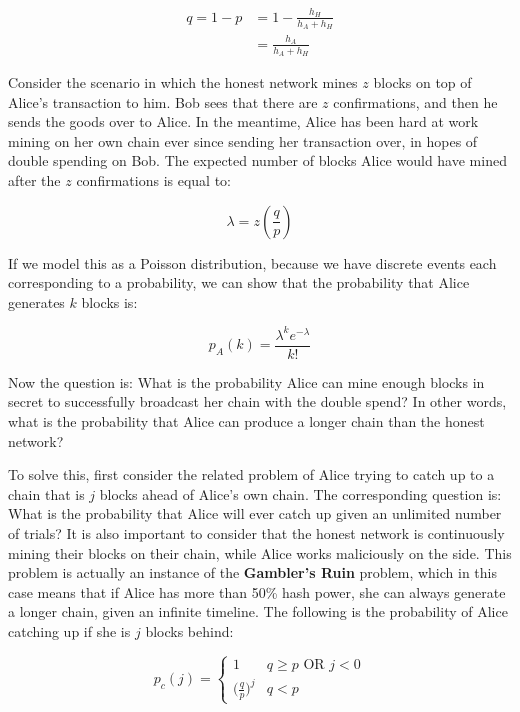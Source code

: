 \documentclass[full.tex]{subfiles}
\begin{document}
   \begin{equation*}
       \begin{split*}
           q = 1-p &= 1 - \frac{h_H}{h_A + h_H} \\
           &= \frac{h_A}{h_A + h_H}
       \end{split*}
   \end{equation*}
   
   Consider the scenario in which the honest network mines $z$ blocks on top of Alice's transaction to him. Bob sees that there are $z$ confirmations, and then he sends the goods over to Alice. In the meantime, Alice has been hard at work mining on her own chain ever since sending her transaction over, in hopes of double spending on Bob. The expected number of blocks Alice would have mined after the $z$ confirmations is equal to:
   
   $$\lambda = z(\frac{q}{p})$$
   
   If we model this as a Poisson distribution, because we have discrete events each corresponding to a probability, we can show that the probability that Alice generates $k$ blocks is:
   
   $$p_A(k) = \frac{\lambda^k e^{-\lambda}}{k!}$$
   
   Now the question is: What is the probability Alice can mine enough blocks in secret to successfully broadcast her chain with the double spend? In other words, what is the probability that Alice can produce a longer chain than the honest network? 
   
   To solve this, first consider the related problem of Alice trying to catch up to a chain that is $j$ blocks ahead of Alice's own chain. The corresponding question is: What is the probability that Alice will ever catch up given an unlimited number of trials? It is also important to consider that the honest network is continuously mining their blocks on their chain, while Alice works maliciously on the side. This problem is actually an instance of the \textbf{Gambler's Ruin} problem, which in this case means that if Alice has more than 50\% hash power, she can always generate a longer chain, given an infinite timeline. The following is the probability of Alice catching up if she is $j$ blocks behind: 
   
   \[ p_c(j) = \begin{cases} 
      1 & q \geq p \text{ OR } j < 0 \\
      \big(\frac{q}{p}\big)^j & q < p
   \end{cases}
   \]
   
\end{document}
